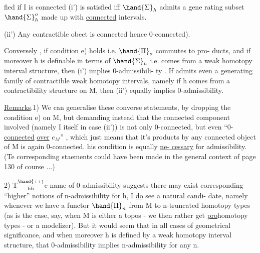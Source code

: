 fied if I is connected\hand{,}   (i') is satisfied iff $\hand{\Sigma}_h$ admits a gene%
rating subset $\hand{\Sigma}_h^o$ made up with \uline{connected} intervals.

(ii') Any contractible obect  is connected \hand{(}hence 0-connected).

 Conversely , if condition e) holds i.e. $\hand{\Pi}_o$ commutes to pro-
ducts,  and if moreover h is definable in terms of $\hand{\Sigma}_h$ i.e. comes
from a weak homotopy interval structure, then (i') implies 0-admissibili-
ty . If  admits even a generating family of contractible weak homotopy
intervals, namely if h comes from a contractibility structure on M, then
(ii') equally implies  0-admissibility.

\uline{Remarks}.1) We can generalise these converse statements, by dropping the
condition e) on M, but demanding instead that the connected component
involved (namely I itself in case (ii')) is not only 0-connected, but
even ``0-\uline{connected} \uline{over} $e_M$'' , which just means that it's products by any
connected object of M is again 0-connected.  his condition is equally \uline{ne-%
%
cessary} for admissibility. (Te corresponding staements could have been
made in the general context of page 130 of course ...)

2) T$\overset{\hand{\scriptscriptstyle\perp\perp}}{\over{\mathrm h}{\mathrm h}}$e name of 0-admissibility suggests there may exist corresponding
``higher'' notions of n-admissibility for h,  I \uline{do} see  a natural candi-%
date, namely whenever we have a functor  $\hand{\Pi}_n$ from M to n-truncated
homotopy types (as is the case, say, when M is either a topos - we
then rather get \uline{pro}homotopy types - or a modelizer). But it would seem
that in all cases of geometrical significance, and when moreover h is
defined by a weak homotopy interval structure, that 0-admissibility
implies  n-admissibility for any n.

